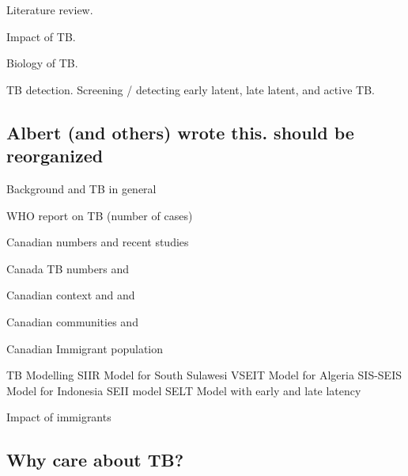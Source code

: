 \documentclass[sn-mathphys,Numbered]{sn-jnl}%
\theoremstyle{thmstyleone}%
\theoremstyle{thmstyletwo}%
\theoremstyle{thmstylethree}%
\begin{document}
Literature review.

Impact of TB.

Biology of TB.

TB detection.  Screening / detecting early latent, late latent, and active TB.

\subsection{Albert (and others) wrote this. should be reorganized}


Background and TB in general

WHO report on TB (number of cases) \cite{WHO2022Global2022}

Canadian numbers and recent studies

Canada TB numbers \cite{MounchiliA.2022TuberculosisReport} and \cite{Long2020TuberculosisCanada}

Canadian context \cite{Ronald2018DemographicStudy} and \cite{CollegeofFamilyPhysiciansofCanada.2017TuberculosisCanada} and \cite{Essue2018BetterCanada}

Canadian communities \cite{Tuite2017StochasticCommunities} and \cite{Amiri2021SpatialCanada} \cite{Zwick2021RepresentingApproach}

Canadian Immigrant population \cite{Ng2018HealthCanada}

TB Modelling
SIIR Model for South Sulawesi \cite{Side2023TheSulawesi}
VSEIT Model for Algeria \cite{Chennaf2023AnalysisEffects}
SIS-SEIS Model for Indonesia \cite{Maulana2022ParameterIndonesia}
SEII model \cite{Permatasari2022MATHEMATICALINFECTION}
SELT Model with early and late latency \cite{Guo2006GlobalTuberculosis}

Impact of immigrants \cite{Inigo2007AnalysisImmigration}

\subsection{Why care about TB?}
\end{document}
